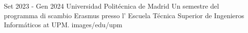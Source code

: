 {Set 2023 - Gen 2024}
{Universidad Politécnica de Madrid}
{Un semestre del programma di scambio Erasmus presso l'
Escuela Técnica Superior de Ingenieros Informáticos
at UPM.}
{images/edu/upm}
